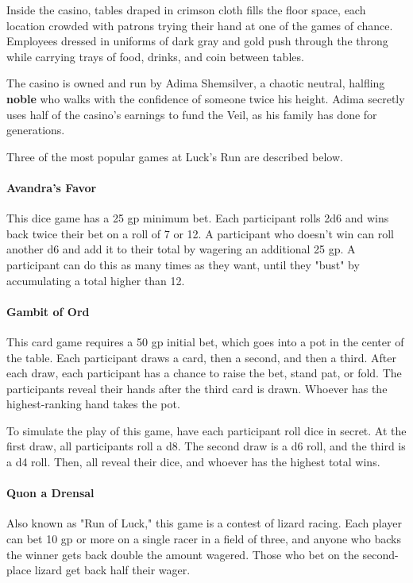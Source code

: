\documentclass[letterpaper, 11pt, bg=full, twocolumn]{dndbook}
\begin{document}
Inside the casino, tables draped in crimson cloth fills the floor space, each location crowded with patrons trying their hand at one of the games of chance. Employees dressed in uniforms of dark gray and gold push through the throng while carrying trays of food, drinks, and coin between tables.

The casino is owned and run by Adima Shemsilver, a chaotic neutral, halfling \textbf{noble} who walks with the confidence of someone twice his height. Adima secretly uses half of the casino's earnings to fund the Veil, as his family has done for generations.

Three of the most popular games at Luck's Run are described below.

\paragraph{Avandra's Favor}

This dice game has a 25 gp minimum bet. Each participant rolls 2d6 and wins back twice their bet on a roll of 7 or 12. A participant who doesn't win can roll another d6 and add it to their total by wagering an additional 25 gp. A participant can do this as many times as they want, until they "bust" by accumulating a total higher than 12.

\paragraph{Gambit of Ord}

This card game requires a 50 gp initial bet, which goes into a pot in the center of the table. Each participant draws a card, then a second, and then a third. After each draw, each participant has a chance to raise the bet, stand pat, or fold. The participants reveal their hands after the third card is drawn. Whoever has the highest-ranking hand takes the pot.

To simulate the play of this game, have each participant roll dice in secret. At the first draw, all participants roll a d8. The second draw is a d6 roll, and the third is a d4 roll. Then, all reveal their dice, and whoever has the highest total wins.

\paragraph{Quon a Drensal}

Also known as "Run of Luck," this game is a contest of lizard racing. Each player can bet 10 gp or more on a single racer in a field of three, and anyone who backs the winner gets back double the amount wagered. Those who bet on the second-place lizard get back half their wager.
\end{document}

